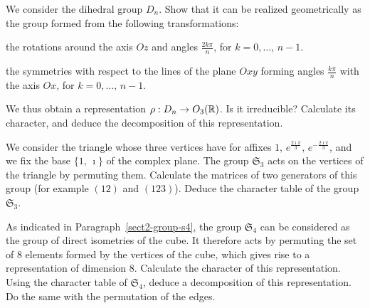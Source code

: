  
\begin{exo}
\label{exo-repr-groupe-diedral}
 
 We consider the dihedral group $ D_n $. Show that it can be realized geometrically as the group formed from the following transformations: \begin{rs}
\item the rotations around the axis $ Oz $ and angles $ \frac{2 k \pi}{n} $, for $ k = 0, \ldots, \, n-1 $.
\item {} the symmetries with respect to the lines of the plane $ Oxy $ forming angles $ \frac{k \pi}{n} $ with the axis $ Ox $, for $ k = 0, \ldots, \, n-1 $.
\end{rs} We thus obtain a representation $ \rho: D_n \rightarrow O_3 (\mathbb{R}) $. Is it irreducible? Calculate its character, and deduce the decomposition of this representation.
\end{exo}
 
 
\begin{exo}
\label{exo-representation-s3}
 
We consider the triangle whose three vertices have for affixes $ 1, \, e^{\frac{2 \imath \pi}{3}}, \, e^{- \frac{2 \imath \pi}{3} } $, and we fix the base $ \{1, \, \imath\} $ of the complex plane. The group $ \mathfrak{S}_3 $ acts on the vertices of the triangle by permuting them. Calculate the matrices of two generators of this group (for example $ (12) $ and $ (123) $). Deduce the character table of the group $ \mathfrak{S}_3 $.
\end{exo}
 
 
\begin{exo}
\label{exo-action-face-cube}
 
As indicated in Paragraph~\ref{sect2-group-s4}, the group $ \mathfrak{S}_4 $ can be considered as the group of direct isometries of the cube. It therefore acts by permuting the set of 8 elements formed by the vertices of the cube, which gives rise to a representation of dimension 8. Calculate the character of this representation. Using the character table of $ \mathfrak{S}_4 $, deduce a decomposition of this representation. Do the same with the permutation of the edges.
\end{exo}
 
